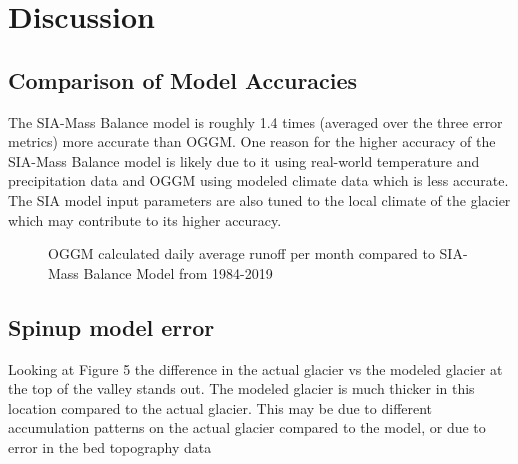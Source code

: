 \documentclass{article}
\begin{document}
\section{Discussion}
\subsection{Comparison of Model Accuracies}
The SIA-Mass Balance model is roughly 1.4 times (averaged over the three error metrics) more accurate than OGGM. One reason for the 
higher accuracy of the SIA-Mass Balance model is likely due to it 
using real-world temperature and precipitation data and OGGM using modeled climate data which is less accurate. The SIA model input 
parameters are also tuned to the local climate of the glacier which may contribute to its higher accuracy.

\begin{figure}[h!]
    \centering
    \caption{OGGM calculated daily average runoff per month compared to SIA-Mass Balance Model from 1984-2019}
    \label{fig:oggm_model_run_1984_2019}
\end{figure}
\FloatBarrier

\subsection{Spinup model error}
Looking at Figure 5 the difference in the actual glacier vs the modeled glacier at the top of the valley stands out. The modeled glacier is much thicker in this 
location compared to the actual glacier. This may be due to different accumulation patterns on the actual glacier compared to the model, or due to error in the bed 
topography data
\end{document}
